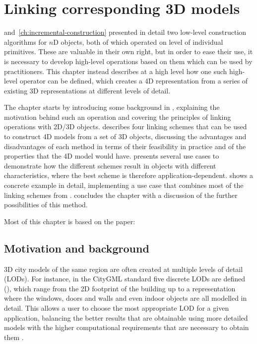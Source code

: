 
\chapter{Linking corresponding 3D models}
\label{ch:linking-lods}

 and~\ref{ch:incremental-construction} presented in detail two low-level construction algorithms for $n$D objects, both of which operated on level of individual primitives.
These are valuable in their own right, but in order to ease their use, it is necessary to develop high-level operations based on them which can be used by practitioners.
This chapter instead describes at a high level how one such high-level operator can be defined, which creates a 4D representation from a series of existing 3D representations at different levels of detail.

The chapter starts by introducing some background in , explaining the motivation behind such an operation and covering the principles of linking operations with 2D/3D objects.
 describes four linking schemes that can be used to construct 4D models from a set of 3D objects, discussing the advantages and disadvantages of each method in terms of their feasibility in practice and of the properties that the 4D model would have.
 presents several use cases to demonstrate how the different schemes result in objects with different characteristics, where the best scheme is therefore application-dependent.
 shows a concrete example in detail, implementing a use case that combines most of the linking schemes from .
 concludes the chapter with a discussion of the further possibilities of this method.

Most of this chapter is based on the paper:
\begin{itemize}
\paperijgind%
\end{itemize}

\section{Motivation and background}
\label{se:linking-background}

3D city models of the same region are often created at multiple levels of detail (LODs).
For instance, in the CityGML standard \citep{CityGML2} five discrete LODs are defined (), which range from the 2D footprint of the building up to a representation where the windows, doors and walls and even indoor objects are all modelled in detail.
This allows a user to choose the most appropriate LOD for a given application, balancing the better results that are obtainable using more detailed models with the higher computational requirements that are necessary to obtain them \citep{Biljecki14}.

